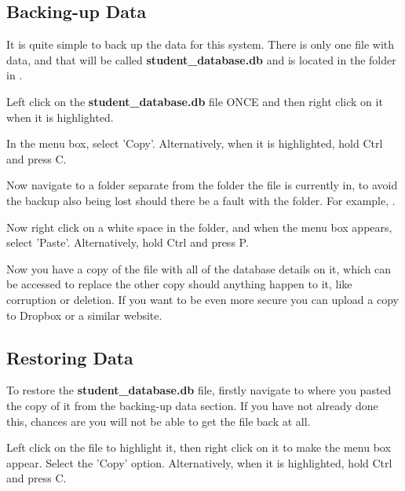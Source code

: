 \subsection{Backing-up Data}

It is quite simple to back up the data for this system. There is only one file with data, and that will be called \textbf{student\_database.db} and is located in the {} folder in {}.


Left click on the \textbf{student\_database.db} file ONCE and then right click on it when it is highlighted.


In the menu box, select 'Copy'. Alternatively, when it is highlighted, hold Ctrl and press C.


Now navigate to a folder separate from the folder the file is currently in, to avoid the backup also being lost should there be a fault with the folder. For example, {}.


Now right click on a white space in the folder, and when the menu box appears, select 'Paste'.  Alternatively, hold Ctrl and press P.


Now you have a copy of the file with all of the database details on it, which can be accessed to replace the other copy should anything happen to it, like corruption or deletion. If you want to be even more secure you can upload a copy to Dropbox or a similar website.

\subsection{Restoring Data}

To restore the \textbf{student\_database.db} file, firstly navigate to where you pasted the copy of it from the backing-up data section. If you have not already done this, chances are you will not be able to get the file back at all.


Left click on the file to highlight it, then right click on it to make the menu box appear. Select the 'Copy' option. Alternatively, when it is highlighted, hold Ctrl and press C.

